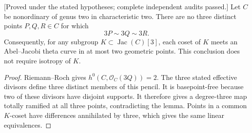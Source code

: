 \begin{corollary}
\label{cor:nonordinary-genus-two-no-three-torsion-triple-candidate}
\textup{[Proved under the stated hypotheses; complete independent audits passed.]}
Let $C$ be nonordinary of genus two in characteristic two. There
are no three distinct points $P,Q,R\in C$ for which
\[
                         3P\sim3Q\sim3R.
\]
Consequently, for any subgroup $K\subset\operatorname{Jac}(C)[3]$,
each coset of $K$ meets an Abel--Jacobi theta curve in at most two
geometric points. This conclusion does not require isotropy of $K$.
\end{corollary}
\begin{proof}
Riemann--Roch gives $h^0(C,\mathcal O_C(3Q))=2$. The three stated
effective divisors define three distinct members of this pencil.
It is basepoint-free because two of these divisors have disjoint
supports. It therefore gives a degree-three map totally ramified
at all three points, contradicting the lemma. Points in a common
$K$-coset have differences annihilated by three, which gives the
same linear equivalences.
\end{proof}


